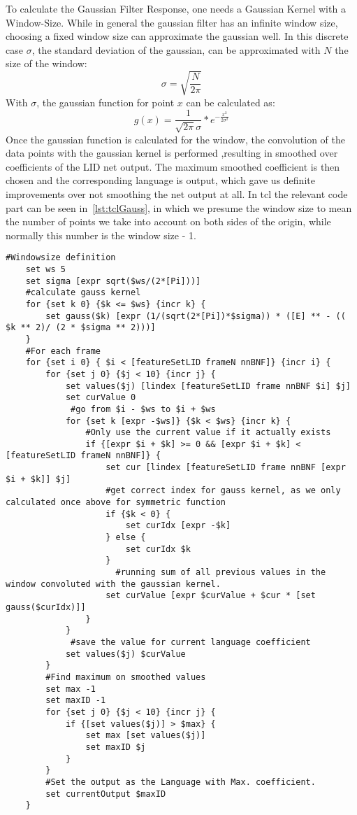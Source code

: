 To calculate the Gaussian Filter Response, one needs a Gaussian Kernel with a Window-Size. While in general the gaussian filter has an infinite window size, choosing a fixed window size can approximate the gaussian well. In this discrete case \(\sigma\), the standard deviation of the gaussian, can be approximated with \(N\) the size of the window:
\begin{equation}
\sigma  =\sqrt{\frac{N}{2\pi}}
\end{equation}
With \(\sigma\), the gaussian function for point \(x\) can be calculated as:
\begin{equation}
g(x) = \frac{1}{\sqrt{2\pi}\sigma} * e^{{- \frac{x^2}{2\sigma^2}}}
\end{equation}
Once the gaussian function is calculated for the window, the convolution of the data points with the gaussian kernel is performed ,resulting in smoothed over coefficients of the LID net output. The maximum smoothed coefficient is then chosen and the corresponding language is output, which gave us definite improvements over not smoothing the net output at all. In tcl the relevant code part can be seen in~\ref{lst:tclGauss}, in which we presume the window size to mean the number of points we take into account on both sides of the origin, while normally this number is the window size - 1.
\begin{lstlisting}[label=lst:tclGauss,caption=Gaussian Smoothing Filter as implemented in tcl/tk for the jrtk]
    #Windowsize definition
    set ws 5
    set sigma [expr sqrt($ws/(2*[Pi]))]
    #calculate gauss kernel
    for {set k 0} {$k <= $ws} {incr k} {
        set gauss($k) [expr (1/(sqrt(2*[Pi])*$sigma)) * ([E] ** - (( $k ** 2)/ (2 * $sigma ** 2)))]
    }
    #For each frame
    for {set i 0} { $i < [featureSetLID frameN nnBNF]} {incr i} {
        for {set j 0} {$j < 10} {incr j} {
            set values($j) [lindex [featureSetLID frame nnBNF $i] $j]
            set curValue 0
	         #go from $i - $ws to $i + $ws
            for {set k [expr -$ws]} {$k < $ws} {incr k} {
                #Only use the current value if it actually exists
                if {[expr $i + $k] >= 0 && [expr $i + $k] < [featureSetLID frameN nnBNF]} {
                    set cur [lindex [featureSetLID frame nnBNF [expr $i + $k]] $j]
                    #get correct index for gauss kernel, as we only calculated once above for symmetric function
                    if {$k < 0} {
                        set curIdx [expr -$k]
                    } else {
                        set curIdx $k
                    }
		              #running sum of all previous values in the window convoluted with the gaussian kernel.
                    set curValue [expr $curValue + $cur * [set gauss($curIdx)]]
                }
            }
	         #save the value for current language coefficient
            set values($j) $curValue
        }
        #Find maximum on smoothed values
        set max -1
        set maxID -1
        for {set j 0} {$j < 10} {incr j} {
            if {[set values($j)] > $max} {
                set max [set values($j)]
                set maxID $j
            }
        }
        #Set the output as the Language with Max. coefficient.
        set currentOutput $maxID
    }
\end{lstlisting}


